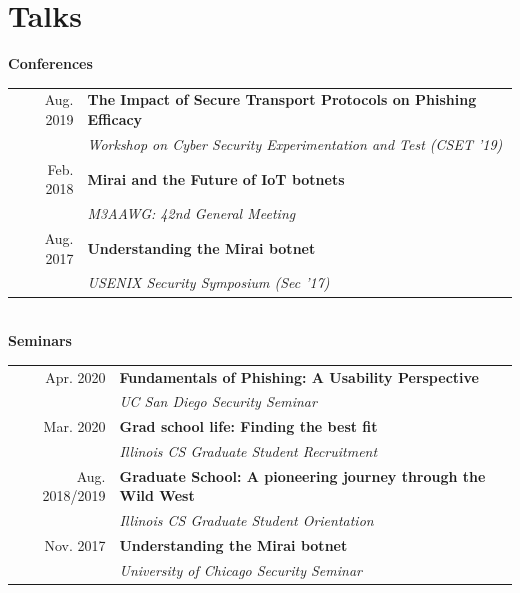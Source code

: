 \documentclass[10pt,singlecolumn]{article} %
\begin{document}
\section{Talks} 

\textbf{Conferences}\\

\begin{tabular}{rl}
Aug. 2019 & \textbf{The Impact of Secure Transport Protocols on Phishing Efficacy} \\
& \emph{Workshop on Cyber Security Experimentation and Test (CSET '19)} \\
Feb. 2018 & \textbf{Mirai and the Future of IoT botnets}\\
& \emph{M3AAWG: 42nd General Meeting} \\ 
Aug. 2017 & \textbf{Understanding the Mirai botnet} \\
& \emph{USENIX Security Symposium (Sec '17)} \\ 
\end{tabular} \\

\vspace{0.3cm}
\textbf{Seminars}\\

\begin{tabular}{rl}
Apr. 2020 & \textbf{Fundamentals of Phishing: A Usability Perspective}\\
& \emph{UC San Diego Security Seminar}\\

Mar. 2020 & \textbf{Grad school life: Finding the best fit}\\
& \emph{Illinois CS Graduate Student Recruitment}\\

Aug. 2018/2019 & \textbf{Graduate School: A pioneering journey through the Wild West}\\
& \emph{Illinois CS Graduate Student Orientation}\\

Nov. 2017 & \textbf{Understanding the Mirai botnet}\\
& \emph{University of Chicago Security Seminar}\\
\end{tabular} \\



\end{document}
